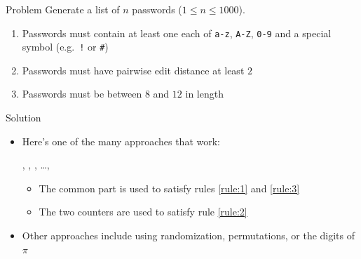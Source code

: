 \begin{frame}
  \frametitle{\problemtitle}
  \begin{block}{Problem}
    Generate a list of $n$ passwords ($1 \le n \le 1000$).
    \begin{enumerate}
      \item\label{rule:1} Passwords must contain at least one each of \texttt{a-z}, \texttt{A-Z}, \texttt{0-9} and a special symbol (e.g.\ \texttt{!} or \texttt{\#})
      \item\label{rule:2} Passwords must have pairwise edit distance at least $2$
      \item\label{rule:3} Passwords must be between $8$ and $12$ in length
    \end{enumerate}
  \end{block}
  \pause
  \begin{block}{Solution}
    \begin{itemize}
      \item Here's one of the many approaches that work:
        \begin{center}
          {},
          {},
          {},
          \dots,
          {}
        \end{center}
        \begin{itemize}
          \item The common part \texttt{{\color{red}{GCPC!x}}} is used to satisfy rules \ref{rule:1} and \ref{rule:3}
          \item The two counters are used to satisfy rule \ref{rule:2}
        \end{itemize}
      \item Other approaches include using randomization, permutations, or the digits of $\pi$
    \end{itemize}
  \end{block}
\end{frame}

